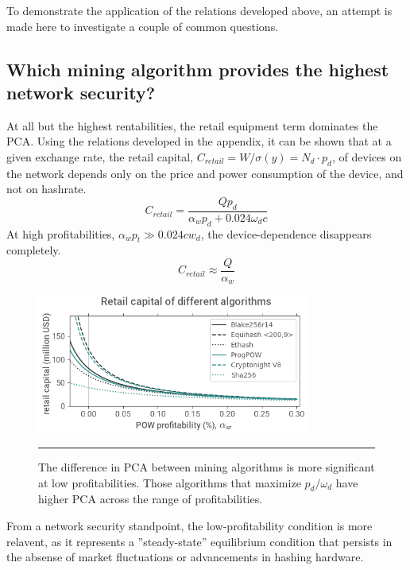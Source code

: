 \documentclass[a4paper,12pt]{article}
\begin{document}
To demonstrate the application of the relations developed above, an attempt is made here to investigate a couple of common questions. 

\subsection{Which mining algorithm provides the highest network security? }

At all but the highest rentabilities, the retail equipment term dominates the PCA. Using the relations developed in the appendix, it can be shown that at a given exchange rate, the retail capital, $ C_{retail} = W / \sigma(y) = N_d \cdot p_d $, of devices on the network depends only on the price and power consumption of the device, and not on hashrate. 
%
\begin{equation}
C_{retail} = \frac{ Q p_d }{ \alpha_w p_d + 0.024 \omega_d c }
\end{equation}
%
At high profitabilities, $ \alpha_w p_t \gg 0.024 c w_d $, the device-dependence disappears completely.
%
\begin{equation}
C_{retail} \approx \frac{ Q }{ \alpha_w }
\end{equation}
%
\begin{figure}[t!]
\vspace{-10pt}
	\begin{center}
	\includegraphics[width=0.80\textwidth]{algo-pcoa}
\begin{minipage}[t]{0.85\textwidth}
	\caption{The difference in PCA between mining algorithms is more significant at low profitabilities. Those algorithms that maximize $ p_d / \omega_d $ have higher PCA across the range of profitabilities.}
	\end{minipage}
  	\end{center}
\hrule
\end{figure}
%

From a network security standpoint, the low-profitability condition is more relavent, as it represents a ''steady-state'' equilibrium condition that persists in the absense of market fluctuations or advancements in hashing hardware. 
\end{document}
